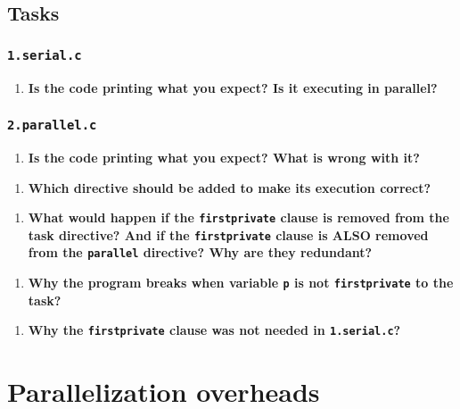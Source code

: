 \documentclass[a4paper]{article}
\begin{document}
\subsection{Tasks}
\subsubsection{\texttt{1.serial.c}}

\begin{enumerate}
	\item \textbf{Is the code printing what you expect? Is it executing in parallel?}
\end{enumerate}

\subsubsection{\texttt{2.parallel.c}}
\begin{enumerate}
	\item \textbf{Is the code printing what you expect? What is wrong with it?}
\end{enumerate}

\begin{enumerate}[resume]
	\item \textbf{Which directive should be added to make its execution correct?}
\end{enumerate}

\begin{enumerate}[resume]
	\item \textbf{What would happen if the \texttt{firstprivate} clause is removed from the task directive? And if the \texttt{firstprivate} clause is ALSO removed from the \texttt{parallel} directive? Why are they redundant?}
\end{enumerate}

\begin{enumerate}[resume]
	\item \textbf{Why the program breaks when variable \texttt{p} is not \texttt{firstprivate} to the task?}
\end{enumerate}

\begin{enumerate}[resume]
	\item \textbf{Why the \texttt{firstprivate} clause was not needed in \texttt{1.serial.c}?}
\end{enumerate}

\section{Parallelization overheads}
\end{document}
